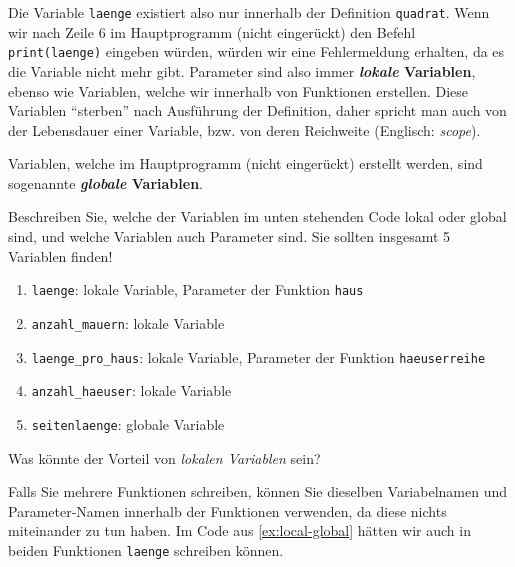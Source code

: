 Die Variable \lstinline|laenge| existiert also nur innerhalb der Definition \lstinline|quadrat|. Wenn wir nach Zeile 6 im Hauptprogramm (nicht eingerückt) den Befehl \lstinline|print(laenge)| eingeben würden, würden wir eine Fehlermeldung erhalten, da es die Variable nicht mehr gibt. Parameter sind also immer \textbf{\textit{lokale} Variablen}, ebenso wie Variablen, welche wir innerhalb von Funktionen erstellen. Diese Variablen \enquote{sterben} nach Ausführung der Definition, daher spricht man auch von der Lebensdauer einer Variable, bzw. von deren Reichweite (Englisch: \textit{scope}).

Variablen, welche im Hauptprogramm (nicht eingerückt) erstellt werden, sind sogenannte \textbf{\textit{globale} Variablen}.

\begin{myexercise}\label{ex:local-global}
	Beschreiben Sie, welche der Variablen im unten stehenden Code lokal oder global sind, und welche Variablen auch Parameter sind. Sie sollten insgesamt 5 Variablen finden!
	

	\begin{myanswer}
		\begin{enumerate}
			\item \lstinline|laenge|: lokale Variable, Parameter der Funktion \lstinline|haus|
			\item \lstinline|anzahl_mauern|: lokale Variable
			\item \lstinline|laenge_pro_haus|: lokale Variable, Parameter der Funktion \lstinline|haeuserreihe|
			\item \lstinline|anzahl_haeuser|: lokale Variable
			\item \lstinline|seitenlaenge|: globale Variable
		\end{enumerate}
	\end{myanswer}
\end{myexercise}

\begin{myexercise}
	Was könnte der Vorteil von \textit{lokalen Variablen} sein?
	\begin{myanswer}
		Falls Sie mehrere Funktionen schreiben, können Sie dieselben Variabelnamen und Parameter-Namen innerhalb der Funktionen verwenden, da diese nichts miteinander zu tun haben. Im Code aus \cref{ex:local-global} hätten wir auch in beiden Funktionen \texttt{laenge} schreiben können.
	\end{myanswer}
\end{myexercise}


